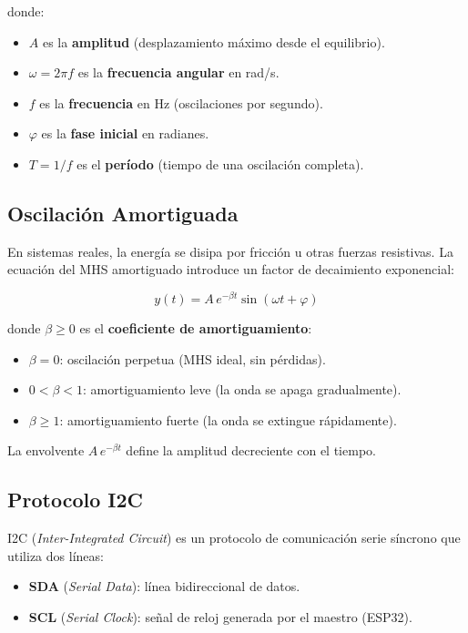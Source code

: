 \documentclass[12pt,a4paper]{article}
\begin{document}
donde:
\begin{itemize}
    \item $A$ es la \textbf{amplitud} (desplazamiento máximo desde el equilibrio).
    \item $\omega = 2\pi f$ es la \textbf{frecuencia angular} en rad/s.
    \item $f$ es la \textbf{frecuencia} en Hz (oscilaciones por segundo).
    \item $\varphi$ es la \textbf{fase inicial} en radianes.
    \item $T = 1/f$ es el \textbf{período} (tiempo de una oscilación completa).
\end{itemize}

\subsection{Oscilación Amortiguada}

En sistemas reales, la energía se disipa por fricción u otras fuerzas resistivas. La ecuación del MHS amortiguado introduce un factor de decaimiento exponencial:

\begin{equation}
y(t) = A \, e^{-\beta t} \sin(\omega t + \varphi)
\label{eq:amortiguado}
\end{equation}

donde $\beta \geq 0$ es el \textbf{coeficiente de amortiguamiento}:
\begin{itemize}
    \item $\beta = 0$: oscilación perpetua (MHS ideal, sin pérdidas).
    \item $0 < \beta < 1$: amortiguamiento leve (la onda se apaga gradualmente).
    \item $\beta \geq 1$: amortiguamiento fuerte (la onda se extingue rápidamente).
\end{itemize}

La envolvente $A \, e^{-\beta t}$ define la amplitud decreciente con el tiempo.

\subsection{Protocolo I2C}

I2C (\textit{Inter-Integrated Circuit}) es un protocolo de comunicación serie síncrono que utiliza dos líneas:
\begin{itemize}
    \item \textbf{SDA} (\textit{Serial Data}): línea bidireccional de datos.
    \item \textbf{SCL} (\textit{Serial Clock}): señal de reloj generada por el maestro (ESP32).
\end{itemize}
\end{document}
